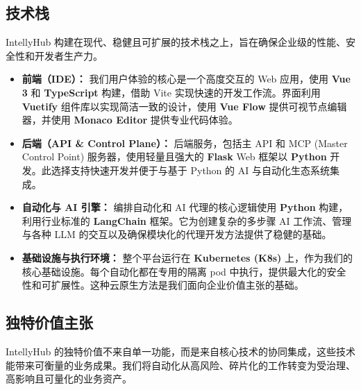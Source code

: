 \documentclass[11pt, a4paper, oneside]{article}
\begin{document}
\pagebreak
\subsection{技术栈}
IntellyHub 构建在现代、稳健且可扩展的技术栈之上，旨在确保企业级的性能、安全性和开发者生产力。

\begin{itemize}
\item \textbf{前端（IDE）：} 我们用户体验的核心是一个高度交互的 Web 应用，使用 \textbf{Vue 3} 和 \textbf{TypeScript} 构建，借助 Vite 实现快速的开发工作流。界面利用 \textbf{Vuetify} 组件库以实现简洁一致的设计，使用 \textbf{Vue Flow} 提供可视节点编辑器，并使用 \textbf{Monaco Editor} 提供专业代码体验。

\item \textbf{后端（API \& Control Plane）：} 后端服务，包括主 API 和 MCP (Master Control Point) 服务器，使用轻量且强大的 \textbf{Flask} Web 框架以 \textbf{Python} 开发。此选择支持快速开发并便于与基于 Python 的 AI 与自动化生态系统集成。

\item \textbf{自动化与 AI 引擎：} 编排自动化和 AI 代理的核心逻辑使用 \textbf{Python} 构建，利用行业标准的 \textbf{LangChain} 框架。它为创建复杂的多步骤 AI 工作流、管理与各种 LLM 的交互以及确保模块化的代理开发方法提供了稳健的基础。

\item \textbf{基础设施与执行环境：} 整个平台运行在 \textbf{Kubernetes (K8s)} 上，作为我们的核心基础设施。每个自动化都在专用的隔离 pod 中执行，提供最大化的安全性和可扩展性。这种云原生方法是我们面向企业价值主张的基础。
\end{itemize}

\subsection{独特价值主张}
IntellyHub 的独特价值不来自单一功能，而是来自核心技术的协同集成，这些技术能带来可衡量的业务成果。我们将自动化从高风险、碎片化的工作转变为受治理、高影响且可量化的业务资产。
\end{document}
